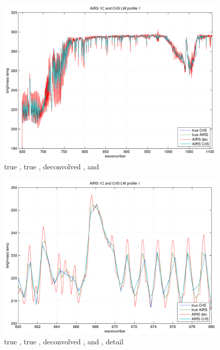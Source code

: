 \documentclass[12pt]{article}
\begin{document}
\begin{figure}
  \centering
  \includegraphics[height=8cm]{figures/airs_cris_spec_LW_noap.pdf}
  \caption{true {\cris}, true {\airs}, deconvolved {\airs}, and
    {\airs} {\cris} }
  \label{aclws}
\end{figure}

\begin{figure}
  \centering
  \includegraphics[height=8cm]{figures/airs_cris_zoom_LW_noap.pdf}
  \caption{true {\cris}, true {\airs}, deconvolved {\airs}, and
    {\airs} {\cris}, detail }
  \label{aclwz}
\end{figure}


\end{document}
